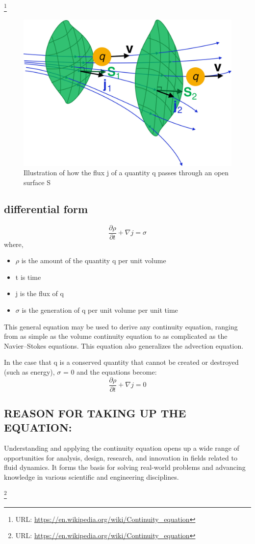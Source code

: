 \documentclass{article}
\begin{document}
\cite{boris1976solution}
\footnote{URL: \url{https://en.wikipedia.org/wiki/Continuity_equation}}
\begin{figure}
    \centering
    \includegraphics{Continuity_eqn_open_surface (1).jpg}
    \caption{Illustration of how the flux j of a quantity q passes through an open surface S}
    \label{fig:enter-label}
\end{figure}
\subsection{differential form}
\begin{equation}
    \frac{\partial \rho}{\partial t} + \nabla j = \sigma
\end{equation}
\cite{seis2017quantitative}
where,
\begin{itemize}
    \item $\rho$ is the amount of the quantity q per unit volume
    \item t is time
    \item j is the flux of q
    \item $\sigma$ is the generation of q per unit volume per unit time
\end{itemize}
This general equation may be used to derive any continuity equation, ranging from as simple as the volume continuity equation to as complicated as the Navier–Stokes equations. This equation also generalizes the advection equation.

In the case that q is a conserved quantity that cannot be created or destroyed (such as energy), $\sigma$ = 0 and the equations become:
\begin{equation}
    \frac{\partial \rho}{\partial t} + \nabla j = 0
\end{equation}
\cite{enwiki:1156826028}
\subsection{REASON FOR TAKING UP THE EQUATION:} 
Understanding and applying the continuity equation opens up a wide range of opportunities for analysis, design, research, and innovation in fields related to fluid dynamics. It forms the basis for solving real-world problems and advancing knowledge in various scientific and engineering disciplines.


\footnote{URL: \url{https://en.wikipedia.org/wiki/Continuity_equation}}
\end{document}
